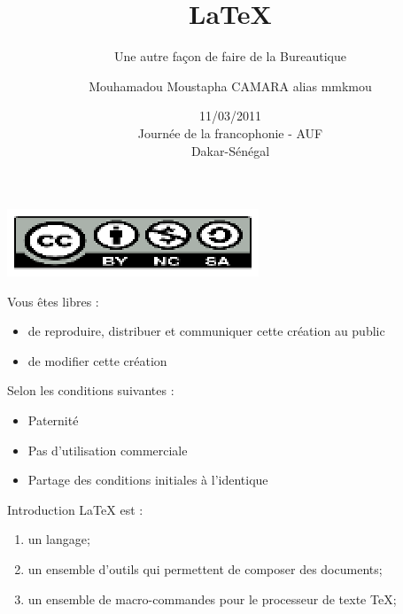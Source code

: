 \documentclass[12pt]{beamer}
\title[\LaTeX{}]{\LaTeX{}}
\subtitle {Une autre façon de faire de la Bureautique}
\author[mmkmou]{Mouhamadou Moustapha CAMARA alias mmkmou}
\institute[]{
\mail{mmkmou@gmail.com} \\
\url{http://mmkmou.legtux.org}
}
\date[DAKARLUG]{11/03/2011  \\Journée de la francophonie - AUF \\ Dakar-Sénégal}
\begin{document}
\begin{frame}[plain]
\titlepage
\end{frame}


\begin{frame}[plain]
\begin{center}

\end{center}
\begin{center}
\includegraphics{image/by-nc-sa}
\end{center}
\begin{block}{Vous \^etes libres : }
\begin{itemize}
\item de reproduire, distribuer et communiquer cette création au public
\item de modifier cette création
\end{itemize}
\end{block}

\begin{block}{Selon les conditions suivantes :}
	\begin{itemize}
		\item Paternité
		\item Pas d'utilisation commerciale
		\item Partage des conditions initiales à l'identique
	\end{itemize}
\end{block}
\end{frame}



\begin{frame}[plain]{Introduction}
	\LaTeX{} est : 
	\begin{enumerate}
		\item<1-> un langage;
		\item<2-> un ensemble d'outils qui permettent de composer des documents; 
		\item<3-> un ensemble de macro-commandes pour le processeur de texte \TeX{}; 
	\end{enumerate}
\end{frame}
\end{document}
